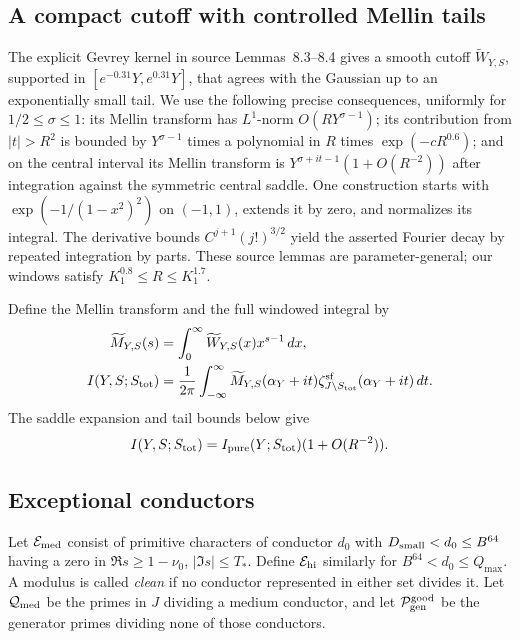 \subsection{A compact cutoff with controlled Mellin tails}

The explicit Gevrey kernel in source Lemmas~8.3--8.4 gives a smooth
cutoff \(\widetilde W_{Y,S}\), supported in
\([e^{-0.31}Y,e^{0.31}Y]\), that agrees with the Gaussian up to an
exponentially small tail.  We use the following precise consequences,
uniformly for \(1/2\le\sigma\le1\): its Mellin transform has
\(L^1\)-norm \(O(RY^{\sigma-1})\); its contribution from
\(|t|>R^2\) is bounded by \(Y^{\sigma-1}\) times a polynomial in
\(R\) times \(\exp(-cR^{0.6})\); and on the central interval its
Mellin transform is
\(Y^{\sigma+it-1}(1+O(R^{-2}))\) after integration against the
symmetric central saddle.  One construction starts with
\(\exp(-1/(1-x^2)^2)\) on \((-1,1)\), extends it by zero, and
normalizes its integral.  The derivative bounds
\(C^{j+1}(j!)^{3/2}\) yield the asserted Fourier decay by repeated
integration by parts.  These source lemmas are parameter-general;
our windows satisfy \(K_1^{0.8}\le R\le K_1^{1.7}\).

Define the Mellin transform and the full windowed integral by
\begin{align*}
 \widetilde M_{Y,S}(s)
    &=\int_0^\infty\widetilde W_{Y,S}(x)x^{s-1}\,dx,\\
 I(Y,S;S_{\rm tot})
    &=\frac1{2\pi}\int_{-\infty}^{\infty}
       \widetilde M_{Y,S}(\alpha_Y+it)
       \zeta_{J\setminus S_{\rm tot}}^{\rm sf}(\alpha_Y+it)\,dt.
\end{align*}
The saddle expansion and tail bounds below give
\begin{equation}\label{eq:I-vs-pure}
 I(Y,S;S_{\rm tot})
 =I_{\rm pure}(Y;S_{\rm tot})(1+O(R^{-2})).
\end{equation}

\subsection{Exceptional conductors}

Let \(\mathcal E_{\rm med}\) consist of primitive characters of
conductor \(d_0\) with
\(D_{\rm small}<d_0\le B^{64}\) having a zero in
\(\Re s\ge1-\nu_0\), \(|\Im s|\le T_*\).
Define \(\mathcal E_{\rm hi}\) similarly for
\(B^{64}<d_0\le Q_{\max}\).  A modulus is called \emph{clean}
if no conductor represented in either set divides it.  Let
\(\mathcal Q_{\rm med}\) be the primes in \(J\) dividing a medium
conductor, and let \(\mathcal P_{\rm gen}^{\rm good}\) be the generator
primes dividing none of those conductors.

